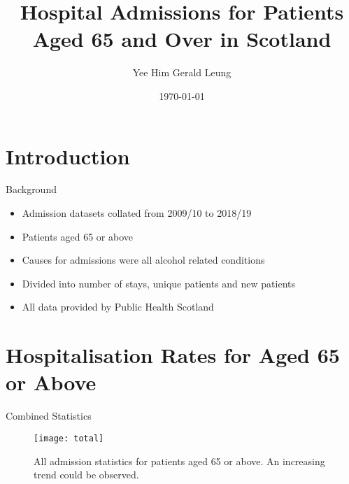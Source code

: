 \documentclass[hyperref={breaklinks,colorlinks,
   urlcolor=blue,citecolor=blue,linkcolor=red}]{beamer}
\title[Public Health Scotland Information Analyst Interview]
{Hospital Admissions for Patients Aged 65 and Over in Scotland}
\author[Gerald Leung]{Yee Him Gerald Leung} %
\date[]{\today}
\begin{document}
\begin{frame}
\titlepage
\end{frame}

\iffalse
\begin{frame}[fragile]{Binder Link}
Binder link: \url{https://mybinder.org/v2/gh/GeraldLYH/XEMRBs-Data/master} \\
GetSNR.py: classes for LISA curve and SNR calculations \\
test$\_$getsnr.py: testing GetSNR.py \\
\iffalse
\\
To run, open terminal and do 
\begin{verbatim}
python new_testing_start.py
\end{verbatim}
\fi
\end{frame}
\fi



\section{Introduction}

\begin{frame}{Background}
\begin{itemize}
\item{Admission datasets collated from 2009/10 to 2018/19}
\item{Patients aged 65 or above}
\item{Causes for admissions were all alcohol related conditions}
\item{Divided into number of stays, unique patients and new patients}
\item{All data provided by Public Health Scotland}
\end{itemize}
\end{frame}

\section{Hospitalisation Rates for Aged 65 or Above}
\begin{frame}{Combined Statistics}
\begin{figure}
\begin{center}
\texttt{[image: total]}
\caption{All admission statistics for patients aged 65 or above. An increasing trend could be observed.}
\end{center}
\end{figure}
\end{frame}
\end{document}
